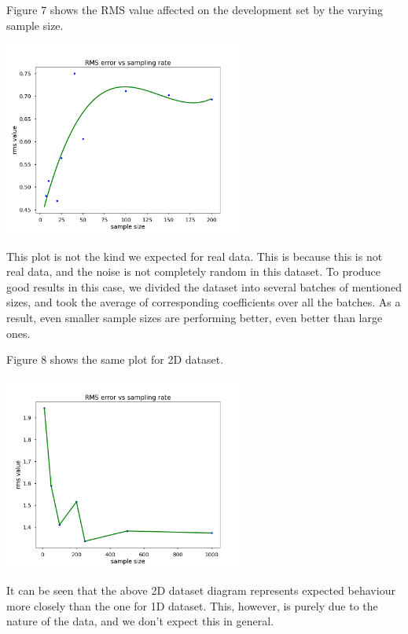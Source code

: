 \documentclass[11pt]{article}
\begin{document}
Figure 7 shows the RMS value affected on the development set by the varying sample size.

\begin{center}
  \includegraphics[width=8cm]
{regression/1d-rms-vs-sample-size-fig.png}
\end{center}

This plot is not the kind we expected for real data. This is because this is not real data, and the noise is not completely random in this dataset.
To produce good results in this case, we divided the dataset into several batches of mentioned sizes, and took the average of corresponding coefficients over all the batches.
As a result, even smaller sample sizes are performing better, even better than large ones.

Figure 8 shows the same plot for 2D dataset.

\begin{center}
  \includegraphics[width=8cm]
{regression/2d-rms-vs-sample-size-fig.png}
\end{center}

It can be seen that the above 2D dataset diagram represents expected behaviour more closely than the one for 1D dataset. This, however, is purely due to the nature of the data, and we don't expect this in general.
\end{document}
